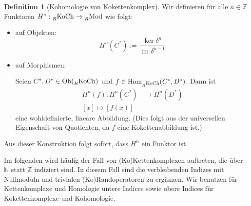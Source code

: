 \documentclass[a4paper,twoside,10pt]{scrreprt}
\DeclareMathOperator{\img}{im}
\newcommand{\Z}{\mathbb{Z}}
\newcommand{\N}{\mathbb{N}}
\theoremstyle{definition}
\newtheorem{definition}[satz]{Definition}
\begin{document}
\begin{definition}[Kohomologie von Kokettenkomplex]\label{def:DefCohomCochain}
Wir definieren für alle $n\in \Z$ Funktoren $H^*:\prescript{}{R}{\text{KoCh}}\to \prescript{}{R}{\text{Mod}}$ wie folgt:
\begin{itemize}
\item auf Objekten:
\begin{equation*}
H^n(C^*):=\frac{\ker\delta^n}{\img\delta^{n-1}}
\end{equation*}
\item auf Morphismen:\par
Seien $C^*,D^*\in \text{Ob}(\prescript{}{R}{\text{KoCh}})$ und $f\in \text{Hom}_{\prescript{}{R}{\text{KoCh}}}(C^*,D^*)$. Dann ist 
\begin{align*}
H^n(f):H^n(C^*)&\to H^n(D^*)\\
[x]\mapsto [f(x)]
\end{align*}
eine wohldefinierte, lineare Abbildung. (Dies folgt aus der universellen Eigenschaft von Quotienten, da $f$ eine Kokettenabbildung ist.)
\end{itemize}
Aus dieser Konstruktion folgt sofort, dass $H^n$ ein Funktor ist.
\end{definition}
Im folgenden wird häufig der Fall von (Ko)Kettenkomplexen auftreten, die über $\N$ statt $\Z$ indiziert sind. In diesem Fall sind die verbleibenden Indizes mit Nullmoduln und trivialen (Ko)Randoperatoren zu ergänzen. Wir benutzen für Kettenkomplexe und Homologie untere Indices sowie obere Indices für Kokettenkomplexe und Kohomologie.
\end{document}
